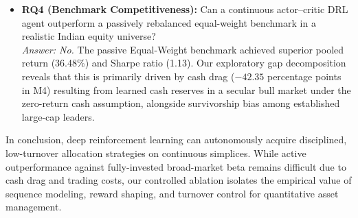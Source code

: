 \documentclass[11pt,a4paper]{article}
\numberwithin{equation}{section}
\numberwithin{table}{section}
\numberwithin{figure}{section}
\numberwithin{algorithm}{section}
\begin{document}
\begin{itemize}
\item \textbf{RQ4 (Benchmark Competitiveness):} Can a continuous actor--critic DRL agent outperform a passively rebalanced equal-weight benchmark in a realistic Indian equity universe?\\
\textit{Answer: No.} The passive Equal-Weight benchmark achieved superior pooled return (36.48\%) and Sharpe ratio (1.13). Our exploratory gap decomposition reveals that this is primarily driven by cash drag ($-42.35$ percentage points in M4) resulting from learned cash reserves in a secular bull market under the zero-return cash assumption, alongside survivorship bias among established large-cap leaders.
\end{itemize}
In conclusion, deep reinforcement learning can autonomously acquire disciplined, low-turnover allocation strategies on continuous simplices. While active outperformance against fully-invested broad-market beta remains difficult due to cash drag and trading costs, our controlled ablation isolates the empirical value of sequence modeling, reward shaping, and turnover control for quantitative asset management.

{\footnotesize\setlength{\bibsep}{1pt}}
\end{document}
